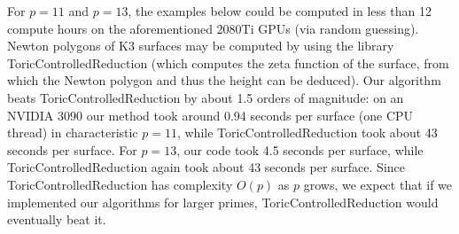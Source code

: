 For $p = 11$ and $p = 13$, 
the examples below could be computed in less than 12 compute hours
on the aforementioned 2080Ti GPUs (via random guessing).
Newton polygons of K3 surfaces may be computed by using the
library ToricControlledReduction
\cite{chk-2019-toric-controlled-reduction} 
(which computes the zeta
function of the surface, from which the Newton polygon and thus the
height can be deduced).
Our algorithm beats ToricControlledReduction by about 1.5 orders of magnitude:
on an NVIDIA 3090 our method took
around 0.94 seconds per surface (one CPU thread) in characteristic \(p = 11\), 
while ToricControlledReduction took 
about 43 seconds per surface.
For \(p = 13\), our 
code took 4.5 seconds per surface, while ToricControlledReduction
again took about 43 seconds per surface.
Since ToricControlledReduction has complexity \(O(p)\) as \(p\)
grows, we expect that if we implemented our algorithms for larger primes,
ToricControlledReduction would eventually beat it.






